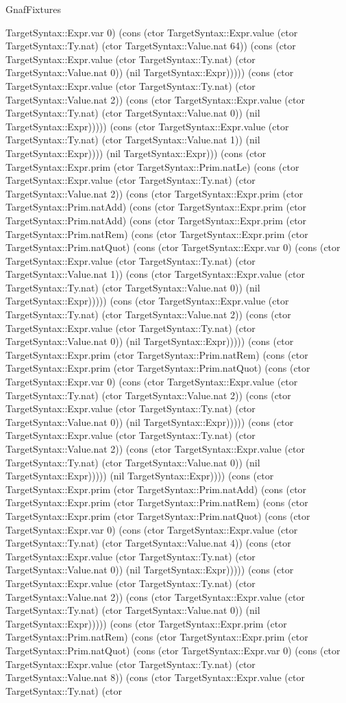 \begin{lexlean}{GnafFixtures}
\begin{semanticmodule}
{TargetSyntax::Expr.var 0) (cons (ctor TargetSyntax::Expr.value (ctor TargetSyntax::Ty.nat) (ctor TargetSyntax::Value.nat 64)) (cons (ctor TargetSyntax::Expr.value (ctor TargetSyntax::Ty.nat) (ctor TargetSyntax::Value.nat 0)) (nil TargetSyntax::Expr))))) (cons (ctor TargetSyntax::Expr.value (ctor TargetSyntax::Ty.nat) (ctor TargetSyntax::Value.nat 2)) (cons (ctor TargetSyntax::Expr.value (ctor TargetSyntax::Ty.nat) (ctor TargetSyntax::Value.nat 0)) (nil TargetSyntax::Expr))))) (cons (ctor TargetSyntax::Expr.value (ctor TargetSyntax::Ty.nat) (ctor TargetSyntax::Value.nat 1)) (nil TargetSyntax::Expr)))) (nil TargetSyntax::Expr))) (cons (ctor TargetSyntax::Expr.prim (ctor TargetSyntax::Prim.natLe) (cons (ctor TargetSyntax::Expr.value (ctor TargetSyntax::Ty.nat) (ctor TargetSyntax::Value.nat 2)) (cons (ctor TargetSyntax::Expr.prim (ctor TargetSyntax::Prim.natAdd) (cons (ctor TargetSyntax::Expr.prim (ctor TargetSyntax::Prim.natAdd) (cons (ctor TargetSyntax::Expr.prim (ctor TargetSyntax::Prim.natRem) (cons (ctor TargetSyntax::Expr.prim (ctor TargetSyntax::Prim.natQuot) (cons (ctor TargetSyntax::Expr.var 0) (cons (ctor TargetSyntax::Expr.value (ctor TargetSyntax::Ty.nat) (ctor TargetSyntax::Value.nat 1)) (cons (ctor TargetSyntax::Expr.value (ctor TargetSyntax::Ty.nat) (ctor TargetSyntax::Value.nat 0)) (nil TargetSyntax::Expr))))) (cons (ctor TargetSyntax::Expr.value (ctor TargetSyntax::Ty.nat) (ctor TargetSyntax::Value.nat 2)) (cons (ctor TargetSyntax::Expr.value (ctor TargetSyntax::Ty.nat) (ctor TargetSyntax::Value.nat 0)) (nil TargetSyntax::Expr))))) (cons (ctor TargetSyntax::Expr.prim (ctor TargetSyntax::Prim.natRem) (cons (ctor TargetSyntax::Expr.prim (ctor TargetSyntax::Prim.natQuot) (cons (ctor TargetSyntax::Expr.var 0) (cons (ctor TargetSyntax::Expr.value (ctor TargetSyntax::Ty.nat) (ctor TargetSyntax::Value.nat 2)) (cons (ctor TargetSyntax::Expr.value (ctor TargetSyntax::Ty.nat) (ctor TargetSyntax::Value.nat 0)) (nil TargetSyntax::Expr))))) (cons (ctor TargetSyntax::Expr.value (ctor TargetSyntax::Ty.nat) (ctor TargetSyntax::Value.nat 2)) (cons (ctor TargetSyntax::Expr.value (ctor TargetSyntax::Ty.nat) (ctor TargetSyntax::Value.nat 0)) (nil TargetSyntax::Expr))))) (nil TargetSyntax::Expr)))) (cons (ctor TargetSyntax::Expr.prim (ctor TargetSyntax::Prim.natAdd) (cons (ctor TargetSyntax::Expr.prim (ctor TargetSyntax::Prim.natRem) (cons (ctor TargetSyntax::Expr.prim (ctor TargetSyntax::Prim.natQuot) (cons (ctor TargetSyntax::Expr.var 0) (cons (ctor TargetSyntax::Expr.value (ctor TargetSyntax::Ty.nat) (ctor TargetSyntax::Value.nat 4)) (cons (ctor TargetSyntax::Expr.value (ctor TargetSyntax::Ty.nat) (ctor TargetSyntax::Value.nat 0)) (nil TargetSyntax::Expr))))) (cons (ctor TargetSyntax::Expr.value (ctor TargetSyntax::Ty.nat) (ctor TargetSyntax::Value.nat 2)) (cons (ctor TargetSyntax::Expr.value (ctor TargetSyntax::Ty.nat) (ctor TargetSyntax::Value.nat 0)) (nil TargetSyntax::Expr))))) (cons (ctor TargetSyntax::Expr.prim (ctor TargetSyntax::Prim.natRem) (cons (ctor TargetSyntax::Expr.prim (ctor TargetSyntax::Prim.natQuot) (cons (ctor TargetSyntax::Expr.var 0) (cons (ctor TargetSyntax::Expr.value (ctor TargetSyntax::Ty.nat) (ctor TargetSyntax::Value.nat 8)) (cons (ctor TargetSyntax::Expr.value (ctor TargetSyntax::Ty.nat) (ctor }
\end{semanticmodule}
\end{lexlean}
